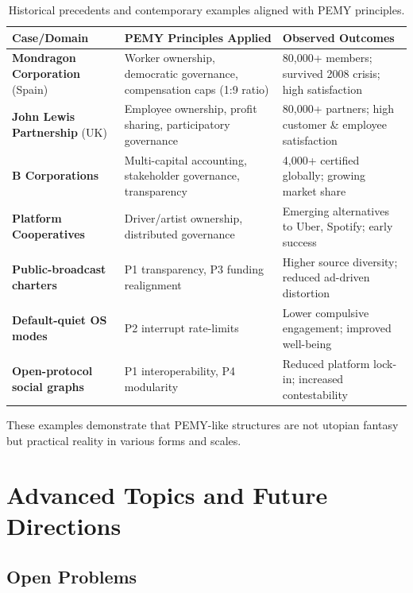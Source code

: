 \documentclass[11pt,a4paper]{article}
\theoremstyle{definition}
\theoremstyle{remark}
\begin{document}
\begin{table}[H]
\centering
\caption{Historical precedents and contemporary examples aligned with PEMY principles.}
\label{tab:pemy_cases}
\renewcommand{\arraystretch}{1.15}
\begin{tabularx}{\linewidth}{@{}lXX@{}}
\toprule
\textbf{Case/Domain} & \textbf{PEMY Principles Applied} & \textbf{Observed Outcomes} \\
\midrule
\textbf{Mondragon Corporation} (Spain) & Worker ownership, democratic governance, compensation caps (1:9 ratio) & 80,000+ members; survived 2008 crisis; high satisfaction \\
\textbf{John Lewis Partnership} (UK) & Employee ownership, profit sharing, participatory governance & 80,000+ partners; high customer \& employee satisfaction \\
\textbf{B Corporations} & Multi-capital accounting, stakeholder governance, transparency & 4,000+ certified globally; growing market share \\
\textbf{Platform Cooperatives} & Driver/artist ownership, distributed governance & Emerging alternatives to Uber, Spotify; early success \\
\textbf{Public-broadcast charters} & P1 transparency, P3 funding realignment & Higher source diversity; reduced ad-driven distortion \\
\textbf{Default-quiet OS modes} & P2 interrupt rate-limits & Lower compulsive engagement; improved well-being \\
\textbf{Open-protocol social graphs} & P1 interoperability, P4 modularity & Reduced platform lock-in; increased contestability \\
\bottomrule
\end{tabularx}
\end{table}

These examples demonstrate that PEMY-like structures are not utopian fantasy but practical reality in various forms and scales.

\section{Advanced Topics and Future Directions}
\label{app:advanced}

\subsection{Open Problems}
\label{app:open_problems}
\end{document}
